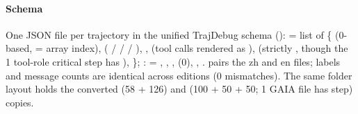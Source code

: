 \paragraph{Schema} One JSON file per trajectory in the unified TrajDebug schema ():  = list of \{ (0-based, = array index),  ( /  /  / ), ,  (tool calls rendered as ),  (strictly , though the 1 tool-role critical step has ), \}; :  = , , ,  (0), , .  pairs the zh and en files; labels and message counts are identical across editions (0 mismatches). The same folder layout holds the converted  (58 + 126) and  (100 + 50 + 50; 1 GAIA file has  step) copies.

